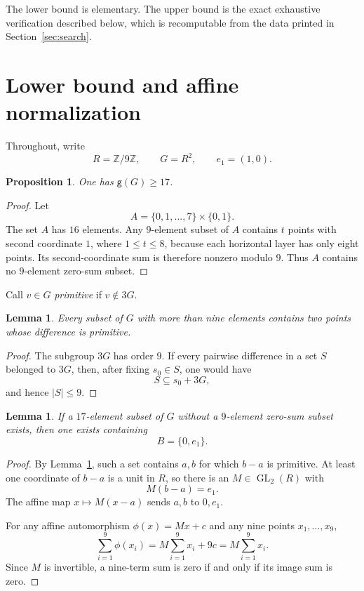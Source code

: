 \documentclass[11pt]{amsart}
\newtheorem{proposition}[theorem]{Proposition}
\newtheorem{lemma}[theorem]{Lemma}
\newcommand{\Z}{\mathbb Z}
\newcommand{\GL}{\operatorname{GL}}
\begin{document}
The lower bound is elementary. The upper bound is the exact exhaustive
verification described below, which is recomputable from the data printed
in Section~\ref{sec:search}.

\section{Lower bound and affine normalization}

Throughout, write
\[
  R=\Z/9\Z,
  \qquad
  G=R^2,
  \qquad
  e_1=(1,0).
\]

\begin{proposition}\label{prop:lower}
One has $\mathsf g(G)\geq17$.
\end{proposition}

\begin{proof}
Let
\[
  A=\{0,1,\ldots,7\}\times\{0,1\}.
\]
The set $A$ has $16$ elements. Any $9$-element subset of $A$ contains
$t$ points with second coordinate $1$, where $1\leq t\leq8$, because
each horizontal layer has only eight points. Its second-coordinate sum is
therefore nonzero modulo $9$. Thus $A$ contains no $9$-element zero-sum
subset.
\end{proof}

Call $v\in G$ \emph{primitive} if $v\notin3G$.

\begin{lemma}\label{lem:primitive}
Every subset of $G$ with more than nine elements contains two points whose
difference is primitive.
\end{lemma}

\begin{proof}
The subgroup $3G$ has order $9$. If every pairwise difference in a set
$S$ belonged to $3G$, then, after fixing $s_0\in S$, one would have
\[
  S\subseteq s_0+3G,
\]
and hence $|S|\leq9$.
\end{proof}

\begin{lemma}\label{lem:normalization}
If a $17$-element subset of $G$ without a $9$-element zero-sum subset
exists, then one exists containing
\[
  B=\{0,e_1\}.
\]
\end{lemma}

\begin{proof}
By Lemma~\ref{lem:primitive}, such a set contains $a,b$ for which
$b-a$ is primitive. At least one coordinate of $b-a$ is a unit in $R$,
so there is an $M\in\GL_2(R)$ with
\[
  M(b-a)=e_1.
\]
The affine map $x\mapsto M(x-a)$ sends $a,b$ to $0,e_1$.

For any affine automorphism $\phi(x)=Mx+c$ and any nine points
$x_1,\ldots,x_9$,
\[
  \sum_{i=1}^9\phi(x_i)
  =
  M\sum_{i=1}^9x_i+9c
  =
  M\sum_{i=1}^9x_i.
\]
Since $M$ is invertible, a nine-term sum is zero if and only if its image
sum is zero.
\end{proof}
\end{document}
